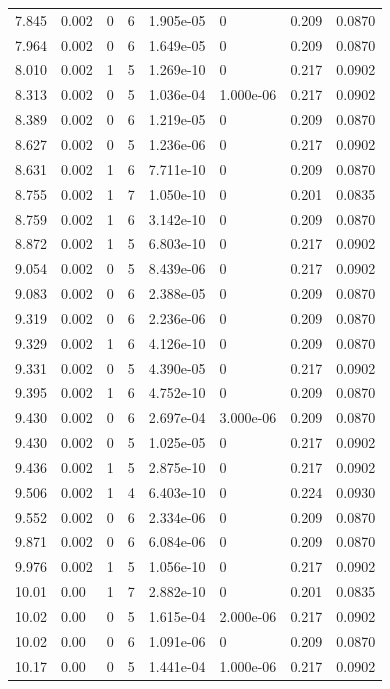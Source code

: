 \documentclass[preview]{standalone}
\begin{document}
{{{\begin{tabular}{L{1.2cm}C{1.2cm} C{0.3cm}C{0.5cm} C{1.4cm}C{1.4cm} C{1.4cm}C{1.4cm}}
  7.845  &  0.002  & 0     &  6 &  1.905e-05  & 0  & 0.209 &  0.0870   \\ 
  7.964  &  0.002  & 0     &  6 &  1.649e-05  & 0  & 0.209 &  0.0870   \\ 
  8.010  &  0.002  & 1     &  5 &  1.269e-10  & 0  & 0.217 &  0.0902   \\ 
  8.313  &  0.002  & 0     &  5 &  1.036e-04  & 1.000e-06  & 0.217 &  0.0902   \\ 
  8.389  &  0.002  & 0     &  6 &  1.219e-05  & 0  & 0.209 &  0.0870   \\ 
  8.627  &  0.002  & 0     &  5 &  1.236e-06  & 0  & 0.217 &  0.0902   \\ 
  8.631  &  0.002  & 1     &  6 &  7.711e-10  & 0  & 0.209 &  0.0870   \\ 
  8.755  &  0.002  & 1     &  7 &  1.050e-10  & 0  & 0.201 &  0.0835   \\ 
  8.759  &  0.002  & 1     &  6 &  3.142e-10  & 0  & 0.209 &  0.0870   \\ 
  8.872  &  0.002  & 1     &  5 &  6.803e-10  & 0  & 0.217 &  0.0902   \\ 
  9.054  &  0.002  & 0     &  5 &  8.439e-06  & 0  & 0.217 &  0.0902   \\ 
  9.083  &  0.002  & 0     &  6 &  2.388e-05  & 0  & 0.209 &  0.0870   \\ 
  9.319  &  0.002  & 0     &  6 &  2.236e-06  & 0  & 0.209 &  0.0870   \\ 
  9.329  &  0.002  & 1     &  6 &  4.126e-10  & 0  & 0.209 &  0.0870   \\ 
  9.331  &  0.002  & 0     &  5 &  4.390e-05  & 0  & 0.217 &  0.0902   \\ 
  9.395  &  0.002  & 1     &  6 &  4.752e-10  & 0  & 0.209 &  0.0870   \\ 
  9.430  &  0.002  & 0     &  6 &  2.697e-04  & 3.000e-06  & 0.209 &  0.0870   \\ 
  9.430  &  0.002  & 0     &  5 &  1.025e-05  & 0  & 0.217 &  0.0902   \\ 
  9.436  &  0.002  & 1     &  5 &  2.875e-10  & 0  & 0.217 &  0.0902   \\ 
  9.506  &  0.002  & 1     &  4 &  6.403e-10  & 0  & 0.224 &  0.0930   \\ 
  9.552  &  0.002  & 0     &  6 &  2.334e-06  & 0  & 0.209 &  0.0870   \\ 
  9.871  &  0.002  & 0     &  6 &  6.084e-06  & 0  & 0.209 &  0.0870   \\ 
  9.976  &  0.002  & 1     &  5 &  1.056e-10  & 0  & 0.217 &  0.0902   \\ 
  10.01  &  0.00  & 1     &  7 &  2.882e-10  & 0  & 0.201 &  0.0835   \\ 
  10.02  &  0.00  & 0     &  5 &  1.615e-04  & 2.000e-06  & 0.217 &  0.0902   \\ 
  10.02  &  0.00  & 0     &  6 &  1.091e-06  & 0  & 0.209 &  0.0870   \\ 
  10.17  &  0.00  & 0     &  5 &  1.441e-04  & 1.000e-06  & 0.217 &  0.0902   \\ 
\hline 
\end{tabular} 

}}}
\end{document}

